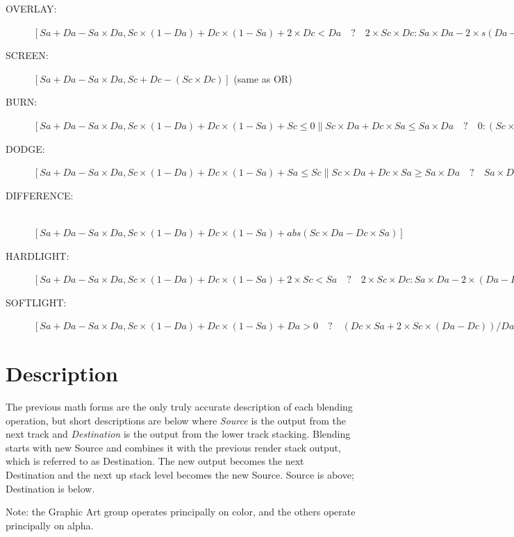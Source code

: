 \begin{description}
    \item[OVERLAY:] $[Sa + Da - Sa \times Da, Sc \times (1 - Da) + Dc \times (1 - Sa) + 2 \times Dc < Da \quad ? \quad 2 \times Sc \times Dc : Sa \times Da - 	2 \times s (Da-Dc) \times (Sa-Sc) ]$
    \item[SCREEN:] $[Sa + Da - Sa \times Da, Sc + Dc - (Sc \times Dc)]$ (same as OR)
    \item[BURN:] $[Sa + Da - Sa \times Da, Sc \times (1 - Da) + Dc \times (1 - Sa) + Sc \leqslant 0 \parallel Sc \times Da + Dc \times Sa \leqslant Sa \times Da \quad ? \quad	0 : (Sc \times Da + Dc \times Sa - Sa \times Da) \times Sa/Sc]$
    \item[DODGE:] $[Sa + Da - Sa \times Da, Sc \times (1 - Da) + Dc \times (1 - Sa) + Sa \leqslant Sc \parallel Sc \times Da + Dc \times Sa \geqslant Sa \times Da \quad ? \quad	Sa \times Da : Dc \times Sa / (1 - Sc/Sa)]$
    \item[DIFFERENCE:]~\\ $[Sa + Da - Sa \times Da,  Sc \times (1 - Da) + Dc \times (1 - Sa) + abs{(Sc \times Da - Dc \times Sa)}]$
    \item[HARDLIGHT:] $[Sa + Da - Sa \times Da, Sc \times (1 - Da) + Dc \times (1 - Sa) + 2 \times Sc < Sa \quad ? \quad 2 \times Sc \times Dc : Sa \times Da - 	2 \times (Da - Dc) \times (Sa - Sc)]$
    \item[SOFTLIGHT:] $[Sa + Da - Sa \times Da, Sc \times (1 - Da) + Dc \times (1 - Sa) + Da > 0 \quad ? \quad (Dc \times Sa + 2 \times Sc \times (Da - 	Dc))/Da : 0]$
\end{description}

\section{Description}%
\label{sec:description}

The previous math forms are the only truly accurate description of each blending operation, but short descriptions are below where \textit{Source} is the output from the next track and \textit{Destination} is the output from the lower track stacking.  Blending starts with new Source and combines it with the previous render stack output, which is referred to as Destination.  The new output becomes the next Destination and the next up stack level becomes the new Source.  Source is above; Destination is below.

Note: the Graphic Art group operates principally on color, and the others operate principally on alpha.

